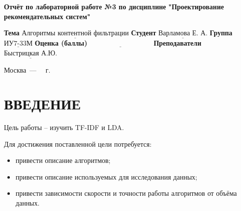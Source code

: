 \documentclass[12pt]{report}
\begin{document}
\begin{titlepage}
	
	\begin{center}
		\noindent\begin{minipage}{1.3\textwidth}\centering
			\Large\textbf{  Отчёт по лабораторной работе №3 по дисциплине}\newline
			\textbf{ "Проектирование рекомендательных систем"}\newline\newline
		\end{minipage}
	\end{center}
	
	\noindent\textbf{Тема} $\underline{\text{Алгоритмы контентной фильтрации}}$\newline\newline
	\noindent\textbf{Студент} $\underline{\text{Варламова Е. А.}}$\newline\newline
	\noindent\textbf{Группа} $\underline{\text{ИУ7-33М}}$\newline\newline
	\noindent\textbf{Оценка (баллы)} $\underline{\text{~~~~~~~~~~~~~~~~~~~~~~~~~~~}}$\newline\newline
	\noindent\textbf{Преподаватели} $\underline{\text{Быстрицкая А.Ю.}}$\newline\newline\newline
	
	\begin{center}
		\vfill
		Москва~---~\the\year
		~г.
	\end{center}
\end{titlepage}
\large
\setcounter{page}{2}
\def\contentsname{СОДЕРЖАНИЕ}
\renewcommand{\contentsname}{СОДЕРЖАНИЕ}
\tableofcontents
\renewcommand\labelitemi{---}
\newpage

\chapter*{ВВЕДЕНИЕ}

Цель работы -- изучить TF-IDF и LDA.

Для достижения поставленной цели потребуется:
\begin{itemize}
	\item привести описание алгоритмов;
	\item привести описание используемых для исследования данных;
	\item привести зависимости скорости и точности работы алгоритмов от объёма данных.
\end{itemize}
\end{document}
